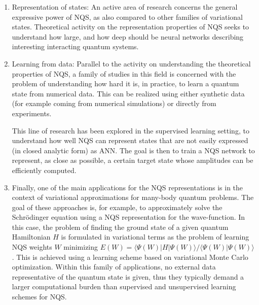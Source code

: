 \documentclass[aip,jcp,reprint,floatfix]{revtex4-1}
\begin{document}
\begin{enumerate}
\item Representation of states: An active area of research concerns the general expressive power
of NQS, as also compared to other families of variational states.
Theoretical activity on the representation properties
of NQS seeks to understand how large, and how deep
should be neural networks describing interesting interacting quantum systems.
\item Learning from data: Parallel to the activity on understanding the theoretical properties of NQS,
a family of studies in this field is concerned with the
problem of understanding how hard it is, in practice, to learn
a quantum state from numerical data.
This can be realized using either synthetic data (for example coming from numerical simulations)
or directly from experiments.

This line of research has been explored in the supervised learning setting, to
understand how well NQS can represent states that are not easily expressed (in closed analytic form) as ANN.
The goal is then to train a NQS network to represent, as close as possible, a certain target state
whose amplitudes can be efficiently computed.
\item Finally, one of the main applications for the NQS representations is in the context
of variational approximations for many-body quantum problems.
The goal of these approaches is, for example, to approximately solve the Schr\"{o}dinger equation using a NQS representation for the wave-function.
In this case, the problem of finding the ground state of a given quantum Hamiltonian $H$ is formulated in variational terms as the problem of learning NQS weights $W$
minimizing $E(W)=\langle\Psi(W)|H|\Psi(W)\rangle/\langle\Psi(W)|\Psi(W)\rangle$. This is achieved using a learning scheme based on variational
Monte Carlo optimization.
Within this family of applications,
no external data representative of the quantum state is given, thus they typically demand a larger computational burden than supervised and unsupervised learning schemes for NQS.
\end{enumerate}
\end{document}
